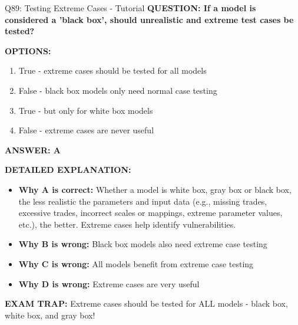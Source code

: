 \documentclass[8pt]{beamer}
\begin{document}
	\begin{frame}{Q89: Testing Extreme Cases - Tutorial}
		\fontsize{6.5}{7.5}\selectfont
		\textbf{QUESTION: If a model is considered a 'black box', should unrealistic and extreme test cases be tested?}
		
		\vspace{0.1cm}
		\textbf{OPTIONS:}
		\begin{enumerate}
			\item True - extreme cases should be tested for all models
			\item False - black box models only need normal case testing
			\item True - but only for white box models
			\item False - extreme cases are never useful
		\end{enumerate}
		
		\vspace{0.1cm}
		\textcolor{myblue}{\textbf{ANSWER: A}}
		
		\vspace{0.1cm}
		\textbf{DETAILED EXPLANATION:}
		\begin{itemize}
			\item \textbf{Why A is correct:} Whether a model is white box, gray box or black box, the less realistic the parameters and input data (e.g., missing trades, excessive trades, incorrect scales or mappings, extreme parameter values, etc.), the better. Extreme cases help identify vulnerabilities.
			\item \textbf{Why B is wrong:} Black box models also need extreme case testing
			\item \textbf{Why C is wrong:} All models benefit from extreme case testing
			\item \textbf{Why D is wrong:} Extreme cases are very useful
		\end{itemize}
		
		\textcolor{myred}{\textbf{EXAM TRAP:}} \textcolor{myblue}{Extreme cases should be tested for ALL models} - black box, white box, and gray box!
	\end{frame}
	
\end{document}
